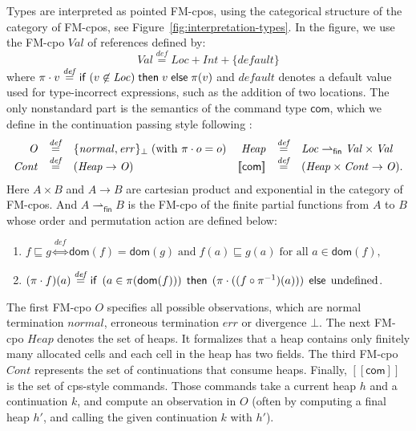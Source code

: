 \documentclass{LMCS}
\newcommand{\com}{\mathsf{com}}
\newcommand{\Loc}{\mathit{Loc}}
\newcommand{\Heap}{\mathit{Heap}}
\newcommand{\Obs}{\mathit{O}}
\newcommand{\cont}{\mathit{Cont}}
\newcommand{\sval}{\mathit{Val}}
\newcommand{\sint}{\mathit{Int}}
\newcommand{\normal}{\mathit{normal}}
\newcommand{\error}{\mathit{err}}
\newcommand{\default}{\mathit{default}}
\newcommand{\fin}{\mathsf{fin}}
\newcommand{\dom}{\mathsf{dom}}
\newcommand{\ff}[1]{[\![#1]\!]}
\newcommand{\key}[1]{{\sf #1}}
\newcommand{\ifthenElse}[3]{\key{if}\; #1 \;\key{then}\; #2 \;\key{else}\; #3}
\newcommand{\defeq}{\stackrel{\mathit{def}}{=}}
\newcommand{\defliff}{\stackrel{\mathit{def}}{\iff}}
\begin{document}
Types are interpreted as pointed FM-cpos,
using the categorical structure of the category of FM-cpos,
see Figure~\ref{fig:interpretation-types}. In the figure,
we use the FM-cpo $\sval$  of references defined by:
$$
\sval  \defeq \Loc + \sint + \{\default\}
$$
where $\pi \cdot v \defeq  \ifthenElse{(v \not\in \Loc)}{v}{\pi(v)}$ and $\default$ denotes a default value used for
type-incorrect expressions, such as the addition of two
locations.
The only nonstandard part
is the semantics of the command type
$\com$, which we define in the continuation passing
style following \cite{PittsAM:monsf,benton}:
$$
\begin{array}{@{}rclrcl@{}}
\Obs & \defeq & \{\normal,\error\}_\bot
\;
(\mbox{with } \pi \cdot o = o)
&
\Heap  & \defeq & 
\Loc \rightharpoonup_\fin \sval \times \sval
\\
\cont  & \defeq & (\Heap \rightarrow \Obs)
&
\ff{\com} & \defeq & (\Heap \times \cont \rightarrow \Obs).
\end{array}
$$
Here $A\times B$ and $A \rightarrow B$ are cartesian product and exponential
in the category of FM-cpos. And $A \rightharpoonup_\fin B$ is the FM-cpo
of the finite partial functions from $A$ to $B$ whose order
and permutation action are defined below:
\begin{enumerate}
\item $f \sqsubseteq g \defliff 
      \dom(f) = \dom(g) \;\mbox{and}\;  f(a) \sqsubseteq g(a) 
      \;\mbox{for all $a \in \dom(f)$,}$ 
\item $(\pi \cdot f)(a) \defeq \ifthenElse{\,(a \in \pi(\dom(f)))\,}{\,(\pi \cdot ((f \circ \pi^{-1})(a)))\,}{\,\mbox{undefined}}$.
\end{enumerate}


The first FM-cpo $\Obs$ specifies all 
possible observations, which are
normal termination $\normal$, erroneous termination $\error$
or divergence $\bot$. The next FM-cpo $\Heap$ 
denotes the set of heaps.  It formalizes that a heap
contains only finitely many allocated cells and each
cell in the heap has two fields. The third FM-cpo $\cont$
represents the set of continuations that consume heaps. Finally,
$\ff{\com}$ is the set of cps-style commands. Those commands
take a current heap $h$ and a continuation $k$,
and compute an observation in $O$ (often by 
computing a final heap $h'$, and
calling the given continuation $k$ with $h'$).
\end{document}
